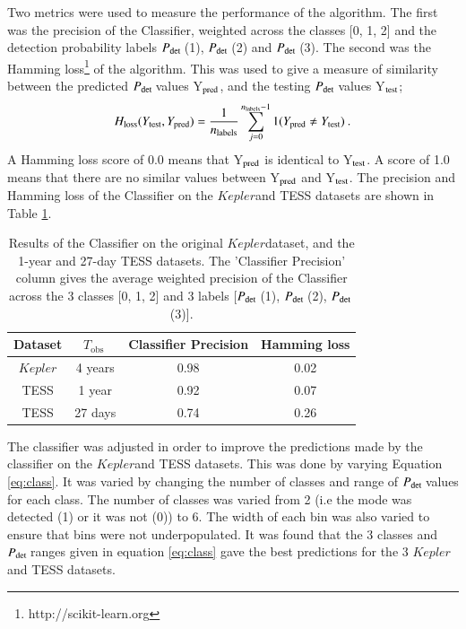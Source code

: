 \documentclass[a4paper,fleqn,usenatbib,useAMS]{mnras}
\newcommand{\kep}{\ensuremath{Kepler}\:}
\newcommand{\pdet}{\ensuremath{P_{\rm det}\:}}
\newcommand{\tobs}{\ensuremath{T_{\textrm{obs}}\:}}
\begin{document}
Two metrics were used to measure the performance of the algorithm. The first was the precision of the Classifier, weighted across the classes [0, 1, 2] and the detection probability labels \pdet(1), \pdet(2) and \pdet(3). The second was the Hamming loss\footnote{http://scikit-learn.org} \citep{wegner_technique_1960} of the algorithm. This was used to give a measure of similarity between the predicted \pdet values Y$_{\rm pred}$, and the testing \pdet values Y$_{\rm test}$;
\begin{equation}
H_{\rm loss}(Y_{\rm test}, Y_{\rm pred}) = \frac{1}{n_{\rm labels}} \sum_{j=0}^{n_{\rm labels}-1} 1(Y_{\rm pred} \neq Y_{\rm test}) \: . 
\end{equation}
A Hamming loss score of 0.0 means that Y$_{\rm pred}$ is identical to Y$_{\rm test}$. A score of 1.0 means that there are no similar values between Y$_{\rm pred}$ and Y$_{\rm test}$. The precision and Hamming loss of the Classifier on the \kep and TESS datasets are shown in Table \ref{tab: results}.
\begin{table}
\begin{center}
\begin{tabular}{ |c|c|c|c| }
Dataset & \tobs   & Classifier Precision & Hamming loss \\
\hline
\kep    & 4 years & 0.98                 & 0.02         \\
TESS    & 1 year  & 0.92                 & 0.07         \\
TESS    & 27 days & 0.74                 & 0.26         \\
\end{tabular}
\end{center}
\caption{Results of the Classifier on the original \kep dataset, and the 1-year and 27-day TESS datasets. The 'Classifier Precision' column gives the average weighted precision of the Classifier across the 3 classes [0, 1, 2] and 3 labels [\pdet(1), \pdet(2), \pdet(3)].}
\label{tab: results}
\end{table}

The classifier was adjusted in order to improve the predictions made by the classifier on the \kep and TESS datasets. This was done by varying Equation \ref{eq:class}. It was varied by changing the number of classes and range of \pdet values for each class. The number of classes was varied from 2 (i.e the mode was detected (1) or it was not (0)) to 6. The width of each bin was also varied to ensure that bins were not underpopulated. It was found that the 3 classes and \pdet ranges given in equation \ref{eq:class} gave the best predictions for the 3 \kep and TESS datasets. 
\end{document}

